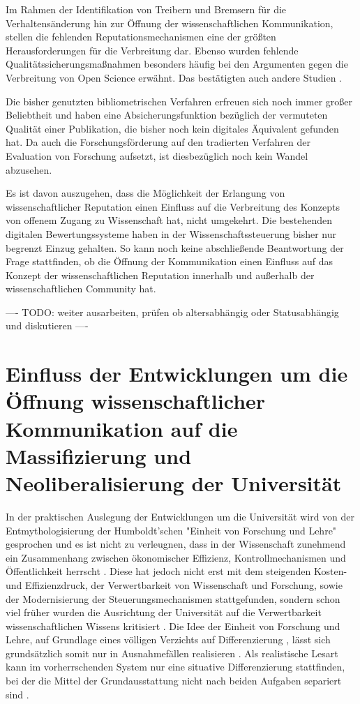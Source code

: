 Im Rahmen der Identifikation von Treibern und Bremsern für die Verhaltensänderung hin zur Öffnung der wissenschaftlichen Kommunikation, stellen die fehlenden Reputationsmechanismen eine der größten Herausforderungen für die Verbreitung dar. Ebenso wurden fehlende Qualitätssicherungsmaßnahmen besonders häufig bei den Argumenten gegen die Verbreitung von Open Science erwähnt. Das bestätigten auch andere Studien \cite{eu_open_science_2015}.

Die bisher genutzten bibliometrischen Verfahren erfreuen sich noch immer großer Beliebtheit und haben eine Absicherungsfunktion bezüglich der vermuteten Qualität einer Publikation, die bisher noch kein digitales Äquivalent gefunden hat. Da auch die Forschungsförderung auf den tradierten Verfahren der Evaluation von Forschung aufsetzt, ist diesbezüglich noch kein Wandel abzusehen.

Es ist davon auszugehen, dass die Möglichkeit der Erlangung von wissenschaftlicher Reputation einen Einfluss auf die Verbreitung des Konzepts von offenem Zugang zu Wissenschaft hat, nicht umgekehrt. Die bestehenden digitalen Bewertungssysteme haben in der Wissenschaftssteuerung bisher nur begrenzt Einzug gehalten. So kann noch keine abschließende Beantwortung der Frage stattfinden, ob die Öffnung der Kommunikation einen Einfluss auf das Konzept der wissenschaftlichen Reputation innerhalb und außerhalb der wissenschaftlichen Community hat.

---- TODO: weiter ausarbeiten, prüfen ob altersabhängig oder Statusabhängig und diskutieren ----

\section{Einfluss der Entwicklungen um die Öffnung wissenschaftlicher Kommunikation auf die Massifizierung und Neoliberalisierung der Universität}

In der praktischen Auslegung der Entwicklungen um die Universität wird von der Entmythologisierung der Humboldt’schen "Einheit von Forschung und Lehre" gesprochen \cite{binswanger_2014_excellence} \cite[:299]{Schimank_2001} \cite[:343]{Kruecken_2001} und es ist nicht zu verleugnen, dass in der Wissenschaft zunehmend ein Zusammenhang zwischen ökonomischer Effizienz, Kontrollmechanismen und Öffentlichkeit herrscht \cite[:27]{Reinhart_intransparenz_2006} \cite{foucault_1977_uberwachen}. Diese hat jedoch nicht erst mit dem steigenden Kosten- und Effizienzdruck, der Verwertbarkeit von Wissenschaft und Forschung, sowie der Modernisierung der Steuerungsmechanismen stattgefunden, sondern schon viel früher wurden die Ausrichtung der Universität auf die Verwertbarkeit wissenschaftlichen Wissens kritisiert \cite{Huber_2005}. Die Idee der Einheit von Forschung und Lehre, auf Grundlage eines völligen Verzichts auf Differenzierung \cite{kittler_2004}, lässt sich grundsätzlich somit nur in Ausnahmefällen realisieren \cite{Schimank_2001}. Als realistische Lesart kann im vorherrschenden System nur eine situative Differenzierung stattfinden, bei der die Mittel der Grundausstattung nicht nach beiden Aufgaben separiert sind \cite{Schimank_2001}.

